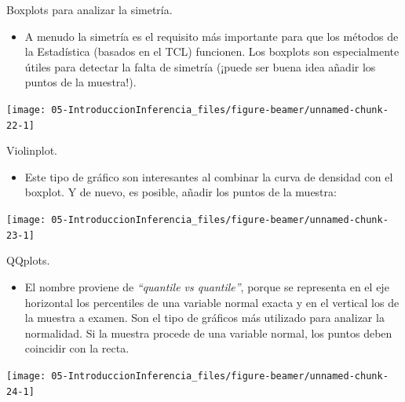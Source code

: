 \documentclass[
  9pt,
  ignorenonframetext,
]{beamer}
\providecommand{\tightlist}{%
  \setlength{\itemsep}{0pt}\setlength{\parskip}{0pt}}
\begin{document}
\begin{frame}{Boxplots para analizar la simetría.}
\protect\hypertarget{boxplots-para-analizar-la-simetria.}{}

\begin{itemize}
\tightlist
\item
  A menudo la simetría es el requisito más importante para que los
  métodos de la Estadística (basados en el TCL) funcionen. Los boxplots
  son especialmente útiles para detectar la falta de simetría (¡puede
  ser buena idea añadir los puntos de la muestra!).
\end{itemize}

\begin{center}\texttt{[image: 05-IntroduccionInferencia\_files/figure-beamer/unnamed-chunk-22-1]} \end{center}

\end{frame}

\begin{frame}{Violinplot.}
\protect\hypertarget{violinplot.}{}

\begin{itemize}
\tightlist
\item
  Este tipo de gráfico son interesantes al combinar la curva de densidad
  con el boxplot. Y de nuevo, es posible, añadir los puntos de la
  muestra:
\end{itemize}

\begin{center}\texttt{[image: 05-IntroduccionInferencia\_files/figure-beamer/unnamed-chunk-23-1]} \end{center}

\end{frame}

\begin{frame}{QQplots.}
\protect\hypertarget{qqplots.}{}

\begin{itemize}
\tightlist
\item
  El nombre proviene de \emph{``quantile vs quantile''}, porque se
  representa en el eje horizontal los percentiles de una variable normal
  exacta y en el vertical los de la muestra a examen. Son el tipo de
  gráficos más utilizado para analizar la normalidad. Si la muestra
  procede de una variable normal, los puntos deben coincidir con la
  recta.
\end{itemize}

\begin{center}\texttt{[image: 05-IntroduccionInferencia\_files/figure-beamer/unnamed-chunk-24-1]} \end{center}

\end{frame}
\end{document}
